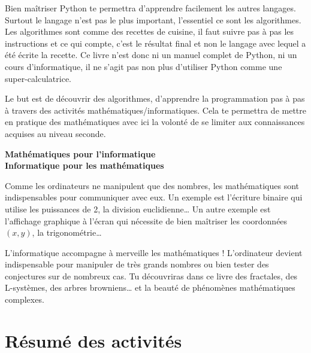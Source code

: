 Bien maîtriser Python te permettra d'apprendre facilement les autres langages. Surtout le langage n'est pas le plus important, l'essentiel ce sont les algorithmes. Les algorithmes sont comme des recettes de cuisine, il faut suivre pas à pas les instructions et ce qui compte, c'est le résultat final et non le langage avec lequel a été écrite la recette. Ce livre n'est donc ni un manuel complet de Python, ni un cours d'informatique, il ne s'agit pas non plus d'utiliser Python comme une super-calculatrice.

Le but est de découvrir des algorithmes, d'apprendre la programmation pas à pas à travers des activités mathématiques/informatiques. Cela te permettra de mettre en pratique des mathématiques avec ici la volonté de se limiter aux connaissances acquises au niveau seconde.

\bigskip

{\large\textbf{Mathématiques pour l'informatique}}\\
{\large\textbf{Informatique pour les mathématiques}}

Comme les ordinateurs ne manipulent que des nombres, les mathématiques sont indispensables pour communiquer avec eux. Un exemple est l'écriture binaire qui utilise les puissances de 2, la division euclidienne\ldots{} Un autre exemple est l'affichage graphique à l'écran qui nécessite de bien maîtriser les  coordonnées $(x,y)$, la trigonométrie\ldots

L'informatique accompagne à merveille les mathématiques ! L'ordinateur devient indispensable pour manipuler de très grands nombres ou bien tester des conjectures sur de nombreux cas. Tu découvriras dans ce livre des fractales, des L-systèmes, des arbres browniens\ldots{} et la beauté de phénomènes mathématiques complexes.

\vspace*{\fill}



\cleardoublepage
\thispagestyle{empty}
\tableofcontents


\newpage

\section*{Résumé des activités}


\newcommand{\titreactivite}[1]{{\large\textbf{#1}}\nopagebreak}
\newcommand{\descriptionactivite}[1]{%
\medskip\hfill
\begin{minipage}{0.95\textwidth}#1\end{minipage}\bigskip}


